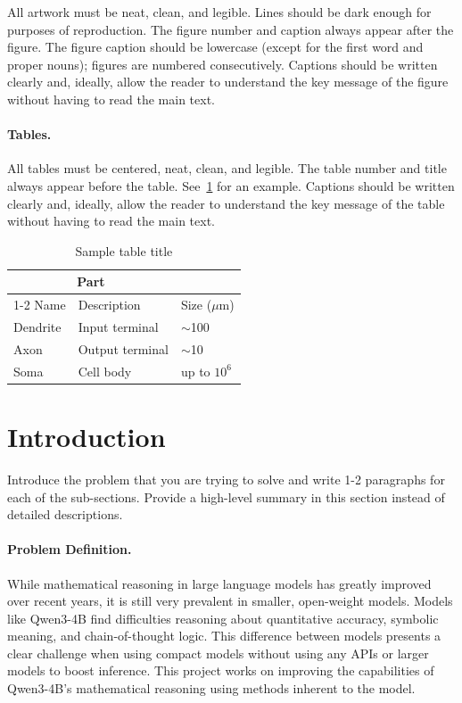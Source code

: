 \documentclass{article}
\begin{document}
All artwork must be neat, clean, and legible. Lines should be dark enough for
purposes of reproduction. The figure number and caption always appear after the figure. The figure caption should be lowercase (except for the first word and
proper nouns); figures are numbered consecutively. Captions should be written clearly and, ideally, allow the reader to understand the key message of the figure without having to read the main text.


\paragraph{Tables.}
All tables must be centered, neat, clean, and legible.  The table number and
title always appear before the table. See~\cref{sample-table} for an example.
Captions should be written clearly and, ideally, allow the reader to understand the key message of the table without having to read the main text.
\begin{table}[h]
  \caption{Sample table title}
  \label{sample-table}
  \centering
  \begin{tabular}{lll}
    \toprule
    \multicolumn{2}{c}{Part}                   \\
    \cmidrule(r){1-2}
    Name     & Description     & Size ($\mu$m) \\
    \midrule
    Dendrite & Input terminal  & $\sim$100     \\
    Axon     & Output terminal & $\sim$10      \\
    Soma     & Cell body       & up to $10^6$  \\
    \bottomrule
  \end{tabular}
\end{table}

\section{Introduction}
\label{sec:intro}
Introduce the problem that you are trying to solve and write 1-2 paragraphs for each of the sub-sections.  Provide a high-level summary in this section instead of detailed descriptions.
\paragraph{Problem Definition.}
While mathematical reasoning in large language models has greatly improved over recent years, it is still very prevalent in smaller, open-weight models. Models like Qwen3-4B find difficulties reasoning about quantitative accuracy, symbolic meaning, and chain-of-thought logic. This difference between models presents a clear challenge when using compact models without using any APIs or larger models to boost inference. This project works on improving the capabilities of Qwen3-4B's mathematical reasoning using methods inherent to the model.
\end{document}

